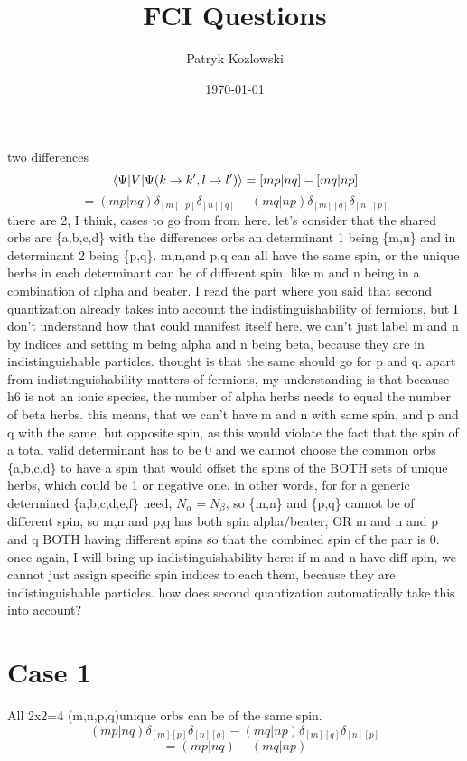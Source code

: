 \documentclass[12pt]{article}
\title{FCI Questions}
\author{Patryk Kozlowski}
\date{\today}
\begin{document}
\maketitle
two differences
\begin{equation}
    \mel{\Psi }{V}{\Psi (k\rightarrow k^{\prime}, l\rightarrow l^{\prime})}
    =[mp|nq]-[mq|np]
\end{equation}
\begin{equation}
    =(mp|nq)\delta _{[m][p]}\delta _{[n][q]}-(mq|np)\delta _{[m][q]}\delta _{[n][p]}
\end{equation}
 there are 2, I think, cases to go from from here. let's consider that the shared orbs are \{a,b,c,d\} with the differences orbs an determinant 1 being \{m,n\} and in determinant 2 being \{p,q\}. m,n,and p,q can all have the same spin, or the unique herbs in each determinant can be of different spin, like m and n being in a combination of alpha and beater. I read the part where you said that second quantization already takes into account the indistinguishability of fermions, but I don't understand how that could manifest itself here. we can't just label m and n by indices and setting m being alpha and n being beta, because they are in indistinguishable particles. thought is that the same should go for p and q. apart from indistinguishability matters of fermions, my understanding is that because h6 is not an ionic species, the number of alpha herbs needs to equal the number of beta herbs. this means, that we can't have m and n with same spin, and p and q with the same, but opposite spin, as this would violate the fact that the spin of a total valid determinant has to be 0 and we cannot choose the common orbs \{a,b,c,d\} to have a spin that would offset the spins of the  BOTH sets of unique herbs, which could be 1 or negative one. in other words, for for a generic determined \{a,b,c,d,e,f\} need, $N_{\alpha }=N_{\beta }$, so \{m,n\} and \{p,q\} cannot be of different spin, so m,n and p,q has both spin alpha/beater, OR m and n and p and q BOTH having different spins so that the combined spin of the pair is 0. once again, I will bring up indistinguishability here: if m and n have diff spin, we cannot just assign specific spin indices to each them, because they are indistinguishable particles. how does second quantization automatically take this into account? 
\section{Case 1}
All 2x2=4 (m,n,p,q)unique orbs can be of the same spin.
\begin{equation}
    (mp|nq)\delta _{[m][p]}\delta _{[n][q]}-(mq|np)\delta _{[m][q]}\delta _{[n][p]}
\end{equation}
\begin{equation}
    =(mp|nq)-(mq|np)
\end{equation}
\end{document}
